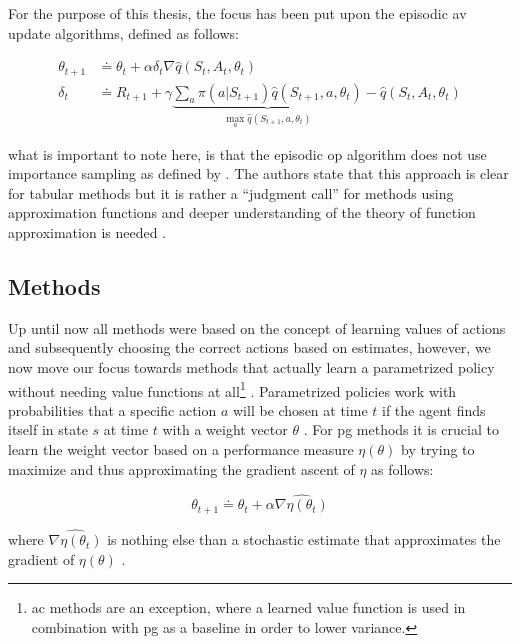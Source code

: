 \documentclass{seal_thesis}
\begin{document}
For the purpose of this thesis, the focus has been put upon the episodic \gls{av} update algorithms, defined as follows:

\begin{align}
	\theta_{t+1} &\doteq \theta_t + \alpha \delta_t \nabla \hat{q} (S_t,A_t,\theta_t)\\
	\delta_t &\doteq R_{t+1} + \gamma \underbrace{\sum_a \pi (a|S_{t+1}) \hat{q} (S_{t+1},a,\theta_t)}_{\max_a \hat{q} (S_{t+1},a,\theta_t)} - \hat{q} (S_t,A_t,\theta_t)
\end{align}

what is important to note here, is that the episodic \gls{op} algorithm does not use importance sampling as defined by  \cite[p. 244]{Sutton2017}. The authors state that this approach is clear for tabular methods but it is rather a ``judgment call'' for methods using approximation functions and deeper understanding of the theory of function approximation is needed \cite[p. 244]{Sutton2017}.

\subsection{ Methods}
\label{subsec:polgrad_methods}

Up until now all methods were based on the concept of learning values of actions and subsequently choosing the correct actions based on estimates, however, we now move our focus towards methods that actually learn a parametrized policy without needing value functions at all\footnote{\gls{ac} methods are an exception, where a learned value function is used in combination with \gls{pg} as a baseline in order to lower variance.}  \cite[p. 265]{Sutton2017}. Parametrized policies work with probabilities that a specific action $a$ will be chosen at time $t$ if the agent finds itself in state $s$ at time $t$ with a weight vector $\theta$ \cite[p. 265]{Sutton2017}. For \gls{pg} methods it is crucial to learn the weight vector based on a performance measure $\eta(\theta)$ by trying to maximize and thus approximating the gradient ascent of $\eta$ as follows:

\begin{equation}
	\theta_{t+1} \doteq \theta_t + \alpha \widehat{\nabla \eta (\theta_t)}
\end{equation}

where $ \widehat{\nabla \eta (\theta_t)}$ is nothing else than a stochastic estimate that approximates the gradient of $\eta(\theta)$ \cite[p. 265]{Sutton2017}.
\end{document}
